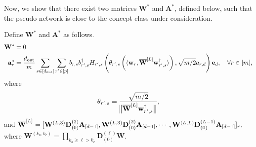 Now, we show that there exist two matrices $\mathbf{W}^{\ast}$ and $\mathbf{A}^{\ast}$, defined below, such that the pseudo network is close to the concept class under consideration.
\begin{definition}\label{def:existence}
	Define $\mathbf{W}^{\ast}$ and $\mathbf{A}^{\ast}$ as follows.
	\begin{align*}
		\mathbf{W}^{\ast} &= 0 \\
		\mathbf{a}^{*}_{r} &= \frac{d_{\mathrm{out}} }{m} \sum_{s \in [d_{\mathrm{out}} ]} \sum_{r' \in [p]} b_{r, s} b_{r', s}^{\dagger} H_{r', s} \left(\theta_{r', s} \left(\langle \mathbf{w}_{r}, \overline{\mathbf{W}}^{[L]} \mathbf{w}_{r', s}^{\dagger}\rangle\right), \sqrt{m/2} a_{r, d}\right) \mathbf{e}_d, \quad \forall r \in [m],
	\end{align*}
	where
	\begin{equation*} 
		\theta_{r', s} = \frac{\sqrt{m/2}}{\norm[1]{ \overline{\mathbf{W}}^{[L]} \mathbf{w}_{r', s}^{\dagger}}},
	\end{equation*}
	and $\overline{\mathbf{W}}^{[L]} = [\mathbf{W}^{(L, 3)} \mathbf{D}_{(0)}^{(2)}\mathbf{A}_{[d-1]}, \mathbf{W}^{(L, 3)} \mathbf{D}_{(0)}^{(2)}\mathbf{A}_{[d-1]}, \cdots, \mathbf{W}^{(L, L)} 
	\mathbf{D}_{(0)}^{(L-1)}\mathbf{A}_{[d-1]}]_r$, where $\mathbf{W}^{(k_b, k_e)} = \prod_{k_b \ge \ell > k_e} \mathbf{D}_{(0)}^{(\ell)} \mathbf{W}$.
\end{definition}


